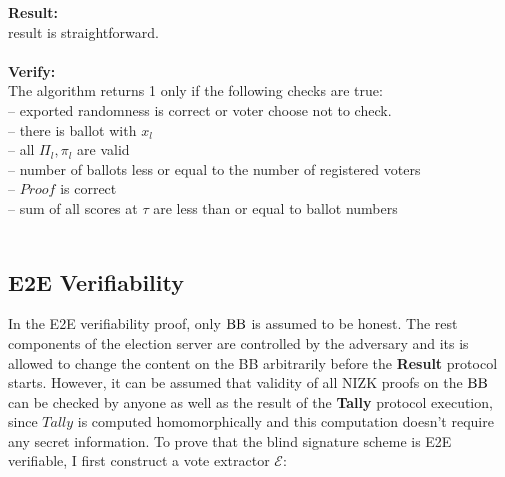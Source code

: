 \textbf{Result:} \\
result is straightforward.\\\\
\textbf{Verify:} \\
The algorithm returns 1 only if the following checks are true:\\
--  exported randomness is correct or voter choose not to check.\\
-- there is ballot with $x_l$\\
-- all $\Pi_l, \pi_l$ are valid\\
-- number of ballots less or equal to the number of registered voters\\
-- $Proof$ is correct\\
-- sum of all scores at $\tau$ are less than or equal to ballot numbers\\\\
\subsection{E2E Verifiability}
In the E2E verifiability proof, only $\operatorname{BB}$ is assumed to be honest. The rest components of the election server are controlled by the adversary and its is allowed to change the content on the BB arbitrarily before the \textbf{Result} protocol starts. However, it can be assumed that validity of all NIZK proofs on the $\operatorname{BB}$ can be checked by anyone as well as the result of the \textbf{Tally} protocol execution, since $Tally$ is computed homomorphically and this computation doesn't require any secret information. To prove that the blind signature scheme is E2E verifiable, I first construct a vote extractor $\mathcal{E}$:\\
 
